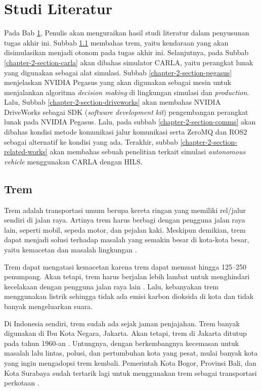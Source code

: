 \chapter{Studi Literatur}\label{chapter-2}

Pada Bab \ref{chapter-2}, Penulis akan menguraikan hasil studi literatur dalam
penyusunan tugas akhir ini. Subbab \ref{chapter-2-section-trem} membahas trem,
yaitu kendaraan yang akan disimulasikan menjadi otonom pada tugas akhir ini.
Selanjutnya, pada Subbab \ref{chapter-2-section-carla} akan dibahas simulator
CARLA, yaitu perangkat lunak yang digunakan sebagai alat simulasi.  Subbab
\ref{chapter-2-section-pegasus} menjelaskan NVIDIA Pegasus yang akan digunakan
sebagai mesin untuk menjalankan algoritma \textit{decision making} di lingkungan
simulasi dan \textit{production}. Lalu, Subbab
\ref{chapter-2-section-driveworks} akan membahas NVIDIA DriveWorks sebagai SDK
(\textit{software development kit}) pengembangan perangkat lunak pada NVIDIA
Pegasus. Lalu, pada subbab \ref{chapter-2-section-comms} akan dibahas kondisi
metode komunikasi jalur komunikasi serta ZeroMQ dan ROS2 sebagai alternatif ke
kondisi yang ada. Terakhir, subbab \ref{chapter-2-section-related-works} akan
membahas sebuah penelitian terkait simulasi \textit{autonomous vehicle}
menggunakan CARLA dengan HILS.

\section{Trem}\label{chapter-2-section-trem}

Trem adalah transportasi umum berupa kereta ringan yang memiliki rel/jalur
sendiri di jalan raya. Artinya trem harus berbagi dengan pengguna jalan raya
lain, seperti mobil, sepeda motor, dan pejalan kaki. Meskipun demikian, trem
dapat menjadi solusi terhadap masalah yang semakin besar di kota-kota besar,
yaitu kemacetan dan masalah lingkungan \parencite{trilaksono_laporanRispro}.

Trem dapat mengatasi kemacetan karena trem dapat memuat hingga 125--250
penumpang.  Akan tetapi, trem harus berjalan lebih lambat untuk menghindari
kecelakaan dengan pengguna jalan raya lain \parencite{trilaksono_laporanRispro}.
Lalu, kebanyakan trem menggunakan listrik sehingga tidak ada emisi karbon
dioksida di kota dan tidak banyak mengeluarkan suara.

Di Indonesia sendiri, trem sudah ada sejak jaman penjajahan. Trem banyak
digunakan di Ibu Kota Negara, Jakarta. Akan tetapi, trem di Jakarta ditutup pada
tahun 1960-an \parencite{adryamarthanino_sejarahTremDiJakarta}. Untungnya,
dengan berkembangnya kecemasan untuk masalah lalu lintas, polusi, dan
pertumbuhan kota yang pesat, mulai banyak kota yang ingin mengadopsi trem
kembali. Pemerintah Kota Bogor, Provinsi Bali, dan Kota Surabaya sudah tertarik
lagi untuk menggunakan trem sebagai transportasi perkotaan
\parencite{trilaksono_laporanRispro}.

